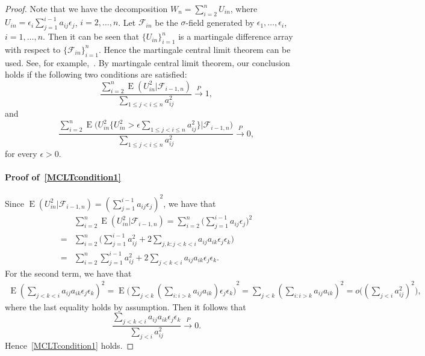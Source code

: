\documentclass[review]{elsarticle}
\DeclareMathOperator{\myE}{E}
\theoremstyle{plain}
\theoremstyle{definition}
\theoremstyle{remark}
\begin{document}
 \begin{proof}
     Note that we have the decomposition $W_n=\sum_{i=2}^n U_{in}$, where $U_{in} =\epsilon_i \sum_{j=1}^{i-1} a_{ij}\epsilon_j$, $i=2,\ldots,n$.
    Let $\mathcal{F}_{in}$ be the $\sigma$-field generated by $\epsilon_1,\ldots,\epsilon_i$, $i=1,\ldots, n$.
     Then it can be seen that $\{U_{in}\}_{i=1}^n$
       is a martingale difference array with respect to $\{\mathcal{F}_{in}\}_{i=1}^n$. 
     Hence the martingale central limit theorem can be used. See, for example,~\citet[Theorem 1 of Chapter VIII ]{pollard1984convergence}.
     By martingale central limit theorem, our conclusion holds if the following two conditions are satisfied:
     \begin{equation}\label{MCLTcondition1}
         \frac{\sum_{i=2}^n \myE(U_{in}^2 |\mathcal{F}_{i-1,n})}{\sum_{1\leq j<i\leq n} a_{ij}^2}\xrightarrow{P} 1,
     \end{equation}
     and
     \begin{equation}\label{MCLTcondition2}
         \frac{\sum_{i=2}^n \myE\big(U_{in}^2\big\{U_{in}^2>\epsilon \sum_{1\leq j<i\leq n} a_{ij}^2\big\}\big|\mathcal{F}_{i-1,n}\big)}{\sum_{1\leq j<i\leq n} a_{ij}^2}\xrightarrow{P} 0,
     \end{equation}
     for every $\epsilon>0$.

     \paragraph{Proof of~\eqref{MCLTcondition1}}
     Since $\myE(U_{in}^2 |\mathcal{F}_{i-1,n})={(\sum_{j=1}^{i-1}a_{ij}\epsilon_j)}^2$, we have that
     \begin{equation*}
         \begin{aligned}
             &\sum_{i=2}^n \myE(U_{in}^2 |\mathcal{F}_{i-1,n})
             =\sum_{i=2}^n \big(\sum_{j=1}^{i-1}a_{ij}\epsilon_j \big)^2\\
             =&\sum_{i=2}^n \big( \sum_{j=1}^{i-1} a_{ij}^2 +2\sum_{j,k:j<k<i} a_{ij}a_{ik}\epsilon_j \epsilon_k \big)\\
             =&\sum_{i=2}^n  \sum_{j=1}^{i-1} a_{ij}^2 +2\sum_{j<k<i} a_{ij}a_{ik}\epsilon_j \epsilon_k.
         \end{aligned}
     \end{equation*}
     For the second term, we have that
     \begin{equation*}
         \begin{aligned}
             \myE{(\sum_{j<k<i} a_{ij}a_{ik}\epsilon_j \epsilon_k)}^2
             =
             \myE{\big(\sum_{j<k} (\sum_{i:i>k}a_{ij}a_{ik})\epsilon_j \epsilon_k \big)}^2
             =
             \sum_{j<k} (\sum_{i:i>k}a_{ij}a_{ik})^2
             =
             o\big({(\sum_{j<i} a_{ij}^2)}^2\big),
         \end{aligned}
     \end{equation*}
     where the last equality holds by assumption.
     Then it follows that
     \begin{equation*}
         \frac{\sum_{j<k<i} a_{ij}a_{ik}\epsilon_j \epsilon_k}{\sum_{j<i} a_{ij}^2}\xrightarrow{P} 0.
     \end{equation*}
     Hence~\eqref{MCLTcondition1} holds.

\end{proof}
\end{document}
